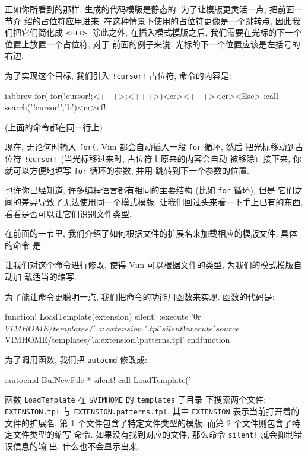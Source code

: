 正如你所看到的那样, 生成的代码模版是静态的. 为了让模版更灵活一点, 把前面一节介
绍的占位符应用进来.
在这种情景下使用的占位符更像是一个跳转点, 因此我们把它们简化成 \texttt{<+++>}.
除此之外, 在插入模式模版之后, 我们需要在光标的下一个位置上放置一个占位符, 对于
前面的例子来说, 光标的下一个位置应该是左括号的右边.

为了实现这个目标, 我们引入 \texttt{!cursor!} 占位符, 命令的内容是:
\begin{vimcode}
iabbrev for( for(!cursor!;<+++>;<+++>){<cr><+++><cr>}<Esc>
    :call search('!cursor!','b')<cr>cf!:
\end{vimcode}
(上面的命令都在同一行上)

现在, 无论何时输入 \texttt{for(}, Vim 都会自动插入一段 \texttt{for} 循环, 然后 
把光标移动到占位符 \texttt{!cursor!} (当光标移过来时, 占位符上原来的内容会自动
被移除). 接下来, 你就可以方便地填写 \texttt{for} 循环的参数, 并用 
跳转到下一个参数的位置.

也许你已经知道, 许多编程语言都有相同的主要结构 (比如 \texttt{for} 循环), 但是 
它们之间的差异导致了无法使用同一个模式模版. 让我们回过头来看一下手上已有的东西,
看看是否可以让它们识别文件类型.

在前面的一节里, 我们介绍了如何根据文件的扩展名来加载相应的模版文件, 具体的命令
是:
让我们对这个命令进行修改, 使得 Vim 可以根据文件的类型, 为我们的模式模版自动加
载适当的缩写.

为了能让命令更聪明一点, 我们把命令的功能用函数来实现. 函数的代码是:
\begin{vimcode}
function! LoadTemplate(extension)
    silent! :execute '0r $VIMHOME/templates/'. a:extension. '.tpl'
    silent! execute 'source $VIMHOME/templates/'.a:extension.'.patterns.tpl'
endfunction
\end{vimcode}
为了调用函数, 我们把 \texttt{autocmd} 修改成:
\begin{vimcode}
:autocmd BufNewFile * silent! call LoadTemplate('%
\end{vimcode}
函数 \texttt{LoadTemplate} 在 \texttt{\$VIMHOME} 的 \texttt{templates} 子目录
下搜索两个文件: \texttt{EXTENSION.tpl} 与 \texttt{EXTENSION.patterns.tpl}.
其中 \texttt{EXTENSION} 表示当前打开着的文件的扩展名.
第 1 个文件包含了特定文件类型的模版, 而第 2 个文件则包含了特定文件类型的缩写
命令. 如果没有找到对应的文件, 那么命令 \texttt{silent!} 就会抑制错误信息的输
出, 什么也不会显示出来.

